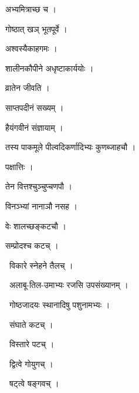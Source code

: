 \documentclass[10pt, openany, oneside]{book}
\begin{document}
\noindent अभ्यमित्राच्छ च ।

\noindent गोष्ठात् खञ् भूतपूर्वे ।

\noindent अश्वस्यैकाहगमः ।

\noindent शालीनकौपीने अधृष्टाकार्ययोः ।

\noindent व्रातेन जीवति ।

\noindent साप्तपदीनं सख्यम् ।

\noindent हैयंगवीनं संज्ञायाम् ।

\noindent तस्य पाकमूले पील्वदिकर्णादिभ्यः कुणब्जाहचौ ।

\noindent पक्षात्तिः ।

\noindent तेन वित्तश्चुञ्चुप्चणपौ ।

\noindent विनञ्भ्यां नानाञौ नसह ।

\noindent वेः शालच्छङ्कटचौ ।

\noindent सम्प्रोदश्च कटच् ।

\par\noindent\hspace{1.5em}{\vps वा॰}~{\qt विकारे स्नेहने तैलच् ।}

\par\noindent\hspace{1.5em}{\vps वा॰}~{\qt अलाबू-तिल-उमाभ्यः रजसि उपसंख्यानम् ।}

\par\noindent\hspace{1.5em}{\vps वा॰}~{\qt गोष्ठजादयः स्थानादिषु पशुनामभ्यः ।}

\par\noindent\hspace{1.5em}{\vps वा॰}~{\qt संघाते कटच् ।}

\par\noindent\hspace{1.5em}{\vps वा॰}~{\qt विस्तारे पटच् ।}

\par\noindent\hspace{1.5em}{\vps वा॰}~{\qt द्वित्वे गोयुगच् ।}

\par\noindent\hspace{1.5em}{\vps वा॰}~{\qt षट्त्वे षङ्गवच् ।}
\end{document}

